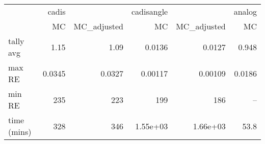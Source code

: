 \begin{tabular}{lrrrrr}
\toprule
{} &  cadis &             & cadisangle &             & analog \\
{} &     MC & MC\_adjusted &         MC & MC\_adjusted &     MC \\
\midrule
tally avg   &   1.15 &        1.09 &     0.0136 &      0.0127 &  0.948 \\
max RE      & 0.0345 &      0.0327 &    0.00117 &     0.00109 & 0.0186 \\
min RE      &    235 &         223 &        199 &         186 &    -- \\
time (mins) &    328 &         346 &   1.55e+03 &    1.66e+03 &   53.8 \\
\bottomrule
\end{tabular}
